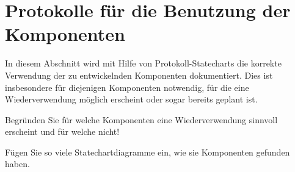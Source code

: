 \section{Protokolle für die Benutzung der Komponenten}

In diesem Abschnitt wird mit Hilfe von Protokoll-Statecharts die korrekte
Verwendung der zu entwickelnden Komponenten dokumentiert. Dies ist insbesondere
für diejenigen Komponenten notwendig, für die eine Wiederverwendung möglich
erscheint oder sogar bereits geplant ist.

Begründen Sie für welche Komponenten eine Wiederverwendung sinnvoll erscheint
und für welche nicht!

Fügen Sie so viele Statechartdiagramme ein, wie sie Komponenten gefunden haben.
